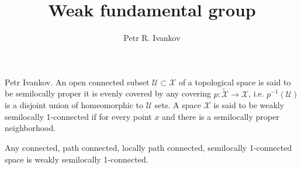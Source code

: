 \documentclass{beamer}
\title{Weak fundamental group}
\institute
{
Noncommutative geometry and topology
}
\author{Petr R. Ivankov  }
\theoremstyle{plain}
\newcommand{\sU}{\mathcal{U}}       %
\newcommand{\sX}{\mathcal{X}}       %
\begin{document}
\begin{frame}
  \titlepage
\end{frame}
\begin{frame}
\begin{definition}\label{top_weakly_semi1_defn}\alert{Petr Ivankov.}
		An open connected subset $\sU\subset \sX$ of a topological space is said to be \alert{semilocally proper} it is evenly covered by any covering $p:\widetilde{\sX}\to\sX$, i.e. $p^{-1}\left(\sU \right)$ is a disjoint union of homeomorphic to $\sU$ sets. 
A space $\sX$ is said to be \alert{weakly semilocally 1-connected} if for  every point $x$ and there is a semilocally proper neighborhood.
\end{definition} 
\begin{example}
	Any connected, path connected, locally path connected, semilocally 1-connected   space is weakly semilocally 1-connected.
\end{example}

\end{frame}
\end{document}
